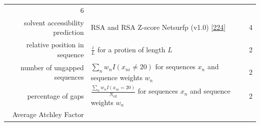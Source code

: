 \documentclass[11pt,a4paper,twoside]{book}
\theoremstyle{definition}
\theoremstyle{definition}
\theoremstyle{remark}
\begin{document}
\begin{longtable}[]{@{}rlc@{}}
\begin{minipage}[t]{0.18\columnwidth}
6\strut
\end{minipage}\tabularnewline
\begin{minipage}[t]{0.23\columnwidth}\raggedleft\strut
solvent accessibility prediction\strut
\end{minipage} & \begin{minipage}[t]{0.50\columnwidth}\raggedright\strut
RSA and RSA Z-score Netsurfp (v1.0)
{[}\protect\hyperlink{ref-Petersen2009a}{224}{]}\strut
\end{minipage} & \begin{minipage}[t]{0.18\columnwidth}\centering\strut
4\strut
\end{minipage}\tabularnewline
\begin{minipage}[t]{0.23\columnwidth}\raggedleft\strut
relative position in sequence\strut
\end{minipage} & \begin{minipage}[t]{0.50\columnwidth}\raggedright\strut
\(\frac{i}{L}\) for a protien of length \(L\)\strut
\end{minipage} & \begin{minipage}[t]{0.18\columnwidth}\centering\strut
2\strut
\end{minipage}\tabularnewline
\begin{minipage}[t]{0.23\columnwidth}\raggedleft\strut
number of ungapped sequences\strut
\end{minipage} & \begin{minipage}[t]{0.50\columnwidth}\raggedright\strut
\(\sum_n w_n I(x_{ni} \neq 20)\) for sequences \(x_n\) and sequence
weights \(w_n\)\strut
\end{minipage} & \begin{minipage}[t]{0.18\columnwidth}\centering\strut
2\strut
\end{minipage}\tabularnewline
\begin{minipage}[t]{0.23\columnwidth}\raggedleft\strut
percentage of gaps\strut
\end{minipage} & \begin{minipage}[t]{0.50\columnwidth}\raggedright\strut
\(\frac{\sum_n w_n I(x_{ni} = 20)}{N_{\text{eff}}}\) for sequences
\(x_n\) and sequence weights \(w_n\)\strut
\end{minipage} & \begin{minipage}[t]{0.18\columnwidth}\centering\strut
2\strut
\end{minipage}\tabularnewline
\begin{minipage}[t]{0.23\columnwidth}\raggedleft\strut
Average Atchley Factor\strut
\end{minipage} & \begin{minipage}[t]{0.50\columnwidth}\raggedright\strut

\end{minipage}
\end{longtable}
\end{document}
